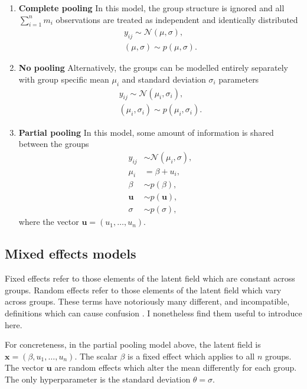 \documentclass[a4paper, nobind]{templates/ociamthesis}
\providecommand{\tightlist}{%
  \setlength{\itemsep}{0pt}\setlength{\parskip}{0pt}}
\begin{document}
\begin{enumerate}
\def\labelenumi{\arabic{enumi}.}
\tightlist
\item
  \textbf{Complete pooling} In this model, the group structure is ignored and all \(\sum_{i = 1}^n m_i\) observations are treated as independent and identically distributed
  \begin{align}
  y_{ij} \sim \mathcal{N}(\mu, \sigma), \\
  (\mu, \sigma) \sim p(\mu, \sigma).
  \end{align}
\item
  \textbf{No pooling} Alternatively, the groups can be modelled entirely separately with group specific mean \(\mu_i\) and standard deviation \(\sigma_i\) parameters
  \begin{align}
  y_{ij} \sim \mathcal{N}(\mu_i, \sigma_i), \\
  (\mu_i, \sigma_i) \sim p(\mu_i, \sigma_i).
  \end{align}
\item
  \textbf{Partial pooling} In this model, some amount of information is shared between the groups
  \begin{align}
  y_{ij} &\sim \mathcal{N}(\mu_i, \sigma), \\
  \mu_i &= \beta + u_i, \\
  \beta &\sim p(\beta), \\
  \mathbf{u} &\sim p(\mathbf{u}), \\
  \sigma &\sim p(\sigma),
  \end{align}
  where the vector \(\mathbf{u} = (u_1, \ldots, u_n)\).
\end{enumerate}

\hypertarget{mixed-effects-models}{%
\subsection{Mixed effects models}\label{mixed-effects-models}}

Fixed effects refer to those elements of the latent field which are constant across groups.
Random effects refer to those elements of the latent field which vary across groups.
These terms have notoriously many different, and incompatible, definitions which can cause confusion \autocite{gelman2005analysis}.
I nonetheless find them useful to introduce here.

For concreteness, in the partial pooling model above, the latent field is \(\mathbf{x} = (\beta, u_1, \ldots, u_n)\).
The scalar \(\beta\) is a fixed effect which applies to all \(n\) groups.
The vector \(\mathbf{u}\) are random effects which alter the mean differently for each group.
The only hyperparameter is the standard deviation \(\theta = \sigma\).
\end{document}
